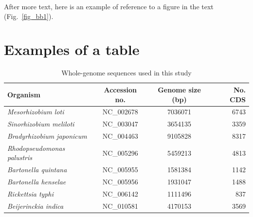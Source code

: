 After more text, here is an example of reference to a figure in the text (Fig.~\ref{fig_bb1}).

\section{Examples of a table}
\begin{table}
    \begin{center}
    \begin{tabular}{|l|c|c|r|}
    \hline
    {\sc Organism}  &  {\sc Accession no.}  & {\sc Genome size} (bp)  & {\sc No. CDS} \\
    \hline
    {\it Mesorhizobium loti}          & NC\_002678 & 7036071 & 6743 \\
    {\it Sinorhizobium meliloti}      & NC\_003047 & 3654135 & 3359 \\
    {\it Bradyrhizobium japonicum}    & NC\_004463 & 9105828 & 8317 \\
    {\it Rhodopseudomonas palustris}  & NC\_005296 & 5459213 & 4813 \\
    {\it Bartonella quintana}         & NC\_005955 & 1581384 & 1142 \\
    {\it Bartonella henselae}         & NC\_005956 & 1931047 & 1488 \\
    {\it Rickettsia typhi}            & NC\_006142 & 1111496 & 837 \\
    {\it Beijerinckia indica}         & NC\_010581 & 4170153 & 3569 \\
    \hline
    \end{tabular}
    \end{center}
    \caption{Whole-genome sequences used in this study}
    \label{table_genomes}
    \end{table}
    
